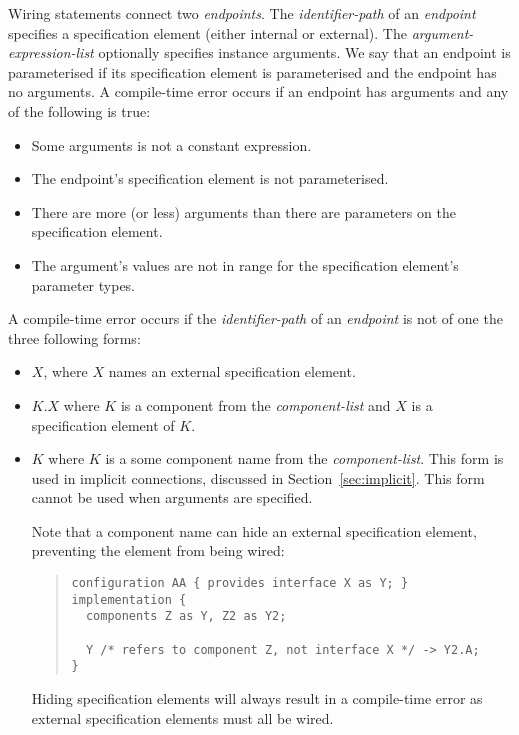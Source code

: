 \documentclass[11pt,letterpaper]{article}
\begin{document}
Wiring statements connect two \emph{endpoints}. The
\emph{identifier-path} of an \emph{endpoint} specifies a specification
element (either internal or external). The
\emph{argument-expression-list} optionally specifies instance
arguments. We say that an endpoint is parameterised if its
specification element is parameterised and the endpoint has no
arguments. A compile-time error occurs if an endpoint has
arguments and any of the following is true:
\begin{itemize}
\item Some arguments is not a constant expression.
\item The endpoint's specification element is not parameterised.
\item There are more (or less) arguments than there are parameters
on the specification element.
\item The argument's values are not in range for the specification element's
parameter types.
\end{itemize}

A compile-time error occurs if the \emph{identifier-path} of an
\emph{endpoint} is not of one the three following forms:
\begin{itemize}
\item $X$, where $X$ names an external specification element.
\item $K.X$ where $K$ is a component from the \emph{component-list} and
$X$ is a specification element of $K$.
\item $K$ where $K$ is a some component name from the
\emph{component-list}.  This form is used in implicit connections,
discussed in Section~\ref{sec:implicit}. This form cannot be used when
arguments are specified.

Note that a component name can hide an external specification element,
preventing the element from being wired:
\begin{quote}
\begin{verbatim}
configuration AA { provides interface X as Y; }
implementation {
  components Z as Y, Z2 as Y2;

  Y /* refers to component Z, not interface X */ -> Y2.A;
}
\end{verbatim}
\end{quote}
Hiding specification elements will always result in a compile-time error as
external specification elements must all be wired.
\end{itemize}
\end{document}
